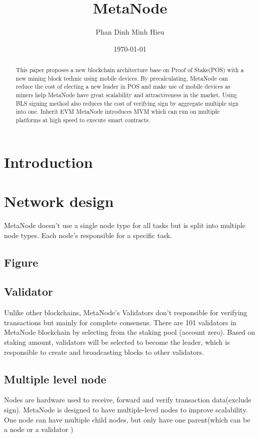 \documentclass [10pt, fancyhdr, twoside] {article}
\begin{document}
\title{MetaNode}
\author {Phan Dinh Minh Hieu}

\date{\today}

\maketitle

\begin{abstract}
This paper proposes a new blockchain architecture base on Proof of Stake(POS) with a new mining block technic using mobile devices.
By precalculating, MetaNode can reduce the cost of electing a new leader in POS and make use of mobile devices as miners help MetaNode have
great scalability and attractiveness in the market. Using BLS signing method also reduces the cost of verifying sign by aggregate multiple sign into one.
Inherit EVM MetaNode introduces MVM which can run on multiple platforms at high speed to execute smart contracts. 
\end{abstract}

\section{Introduction}
\blindtext

\section{Network design}
MetaNode doesn't use a single node type for all tasks but is split into multiple node types. Each node's responsible for a specific task.
\subsection{Figure}
\subsection{Validator}
Unlike other blockchains, MetaNode's Validators don't responsible for verifying transactions but mainly for complete consensus.
There are 101 validators in MetaNode blockchain by selecting from the staking pool (account zero). Based on staking amount, validators will be selected to become the leader, which is responsible
to create and broadcasting blocks to other validators.
\subsection{Multiple level node}
Nodes are hardware used to receive, forward and verify transaction data(exclude sign). MetaNode is designed to have multiple-level nodes to improve scalability. One node can have multiple child nodes, but only have one parent(which can be a node
or a validator )
\end{document}
